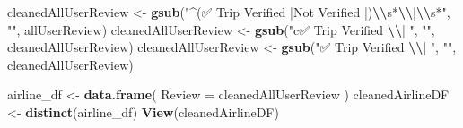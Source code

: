 \documentclass[
]{article}
\newenvironment{Shaded}{\begin{snugshade}}{\end{snugshade}}
\newcommand{\AttributeTok}[1]{\textcolor[rgb]{0.13,0.29,0.53}{#1}}
\newcommand{\FunctionTok}[1]{\textcolor[rgb]{0.13,0.29,0.53}{\textbf{#1}}}
\newcommand{\NormalTok}[1]{#1}
\newcommand{\OtherTok}[1]{\textcolor[rgb]{0.56,0.35,0.01}{#1}}
\newcommand{\SpecialCharTok}[1]{\textcolor[rgb]{0.81,0.36,0.00}{\textbf{#1}}}
\newcommand{\StringTok}[1]{\textcolor[rgb]{0.31,0.60,0.02}{#1}}
\begin{document}
\begin{Shaded}
\begin{Highlighting}[]
\NormalTok{cleanedAllUserReview }\OtherTok{\textless{}{-}} \FunctionTok{gsub}\NormalTok{(}\StringTok{"\^{}(✅ Trip Verified |Not Verified |)}\SpecialCharTok{\textbackslash{}\textbackslash{}}\StringTok{s*}\SpecialCharTok{\textbackslash{}\textbackslash{}}\StringTok{|}\SpecialCharTok{\textbackslash{}\textbackslash{}}\StringTok{s*"}\NormalTok{, }\StringTok{""}\NormalTok{, allUserReview)}
\NormalTok{cleanedAllUserReview }\OtherTok{\textless{}{-}} \FunctionTok{gsub}\NormalTok{(}\StringTok{"c✅ Trip Verified }\SpecialCharTok{\textbackslash{}\textbackslash{}}\StringTok{| "}\NormalTok{, }\StringTok{""}\NormalTok{,  cleanedAllUserReview)}
\NormalTok{cleanedAllUserReview }\OtherTok{\textless{}{-}} \FunctionTok{gsub}\NormalTok{(}\StringTok{"✅ Trip Verified }\SpecialCharTok{\textbackslash{}\textbackslash{}}\StringTok{| "}\NormalTok{, }\StringTok{""}\NormalTok{,  cleanedAllUserReview)}

\NormalTok{airline\_df }\OtherTok{\textless{}{-}} \FunctionTok{data.frame}\NormalTok{(}
  \AttributeTok{Review =}\NormalTok{ cleanedAllUserReview}
\NormalTok{)}
\NormalTok{cleanedAirlineDF }\OtherTok{\textless{}{-}} \FunctionTok{distinct}\NormalTok{(airline\_df)}
\FunctionTok{View}\NormalTok{(cleanedAirlineDF)}
\end{Highlighting}
\end{Shaded}
\end{document}
